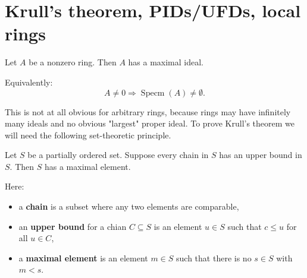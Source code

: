\section{Krull's theorem, PIDs/UFDs, local rings}

\begin{thm}
    Let $A$ be a nonzero ring. Then $A$ has a maximal 
    ideal. 

    Equivalently: 
    \[
        A \neq 0 
        \Rightarrow \operatorname{Specm}(A) \neq \emptyset. 
    \]
\end{thm}
This is not at all obvious for arbitrary rings, because 
rings may have infinitely many ideals and no obvious "largest" 
proper ideal. To prove Krull's theorem we will need 
the following set-theoretic principle. 

\begin{lem}
    Let $S$ be a partially ordered set. Suppose 
    every chain in $S$ has an upper bound in $S$. 
    Then $S$ has a maximal element. 
\end{lem}

Here: 
\begin{itemize}
    \item a \textbf{chain} is a subset where any 
        two elements are comparable, 
    \item an \textbf{upper bound} for a chian 
        $C \subseteq S$ is an element $u \in S$ such 
        that $c \leq u$ for all $u \in C$, 
    \item a \textbf{maximal element} is an element 
        $m \in S$ such that there is no $s \in S$ 
        with $m < s$. 
\end{itemize}

